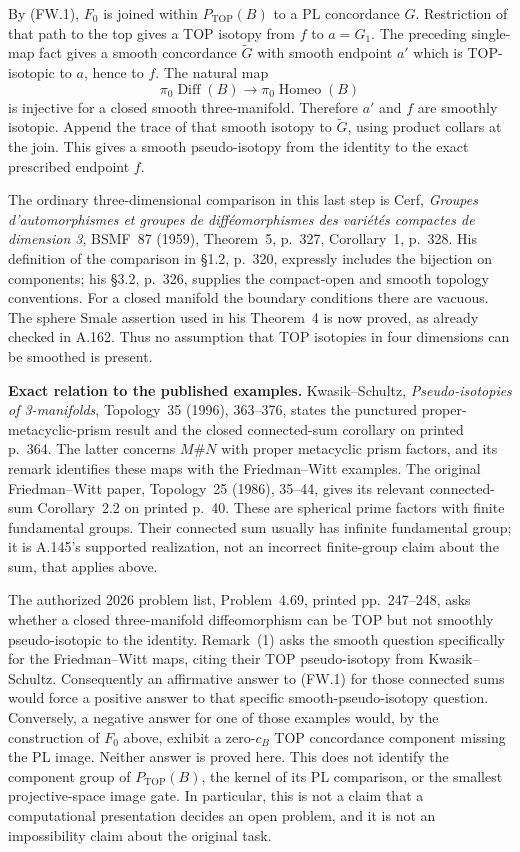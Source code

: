 By (FW.1), $F_0$ is joined within $P_{\mathrm{TOP}}(B)$ to a PL
concordance $G$. Restriction of that path to the top gives a TOP
isotopy from $f$ to $a=G_1$. The preceding single-map fact gives a
smooth concordance $\widetilde G$ with smooth endpoint $a'$ which is
TOP-isotopic to $a$, hence to $f$. The natural map
\[
 \pi_0\operatorname{Diff}(B)\longrightarrow
                    \pi_0\operatorname{Homeo}(B)
\]
is injective for a closed smooth three-manifold. Therefore $a'$ and
$f$ are smoothly isotopic. Append the trace of that smooth isotopy to
$\widetilde G$, using product collars at the join. This gives a smooth
pseudo-isotopy from the identity to the exact prescribed endpoint $f$.

The ordinary three-dimensional comparison in this last step is
Cerf, \emph{Groupes d'automorphismes et groupes de diff\'eomorphismes des
vari\'et\'es compactes de dimension 3}, BSMF~87 (1959), Theorem~5,
p.~327, Corollary~1, p.~328. His definition of the comparison in
\S1.2, p.~320, expressly includes the bijection on components; his
\S3.2, p.~326, supplies the compact-open and smooth topology conventions.
For a closed manifold the boundary conditions there are vacuous.
The sphere Smale assertion used in his Theorem~4 is now proved, as
already checked in A.162. Thus no assumption that TOP isotopies in
four dimensions can be smoothed is present.

\textbf{Exact relation to the published examples.}\quad
Kwasik--Schultz, \emph{Pseudo-isotopies of 3-manifolds}, Topology~35
(1996), 363--376, states the punctured proper-metacyclic-prism result
and the closed connected-sum corollary on printed p.~364. The latter
concerns $M\#N$ with proper metacyclic prism factors, and its remark
identifies these maps with the Friedman--Witt examples. The original
Friedman--Witt paper, Topology~25 (1986), 35--44, gives its relevant
connected-sum Corollary~2.2 on printed p.~40. These are spherical
prime factors with finite fundamental groups. Their connected sum
usually has infinite fundamental group; it is A.145's supported
realization, not an incorrect finite-group claim about the sum, that
applies above.

The authorized 2026 problem list, Problem~4.69, printed pp.~247--248,
asks whether a closed three-manifold diffeomorphism can be TOP but not
smoothly pseudo-isotopic to the identity. Remark~(1) asks the smooth
question specifically for the Friedman--Witt maps, citing their TOP
pseudo-isotopy from Kwasik--Schultz. Consequently an affirmative
answer to (FW.1) for those connected sums would force a positive answer
to that specific smooth-pseudo-isotopy question. Conversely, a negative
answer for one of those examples would, by the construction of $F_0$
above, exhibit a zero-$c_B$ TOP concordance component missing the PL
image. Neither answer is proved here. This does not identify the
component group of $P_{\mathrm{TOP}}(B)$, the kernel of its PL comparison,
or the smallest projective-space image gate. In particular, this is
not a claim that a computational presentation decides an open problem,
and it is not an impossibility claim about the original task.


